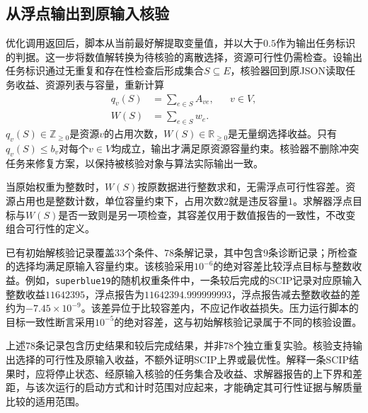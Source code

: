 \subsection{从浮点输出到原输入核验}

优化调用返回后，脚本从当前最好解提取变量值，并以大于$0.5$作为输出任务标识的判据。这一步将数值解转换为待核验的离散选择，资源可行性仍需检查。设输出任务标识通过无重复和存在性检查后形成集合$S\subseteq E$，核验器回到原JSON读取任务收益、资源列表与容量，重新计算
\begin{align}
 q_v(S)&=\sum_{e\in S}A_{ve},
 &&v\in V,
 \label{s0301:verified_load}\\
 W(S)&=\sum_{e\in S}w_e.
 \label{s0301:verified_value}
\end{align}
$q_v(S)\in\mathbb{Z}_{\geq0}$是资源$v$的占用次数，$W(S)\in\mathbb{R}_{\geq0}$是无量纲选择收益。只有$q_v(S)\leq b_v$对每个$v\in V$均成立，输出才满足原资源容量约束。核验器不删除冲突任务来修复方案，以保持被核验对象与算法实际输出一致。

当原始权重为整数时，$W(S)$按原数据进行整数求和，无需浮点可行性容差。资源占用也是整数计数，单位容量约束下，占用次数$2$就是违反容量$1$。求解器浮点目标与$W(S)$是否一致则是另一项检查，其容差仅用于数值报告的一致性，不改变组合可行性的定义。

已有初始解核验记录覆盖$33$个条件、$78$条解记录，其中包含$9$条诊断记录；所检查的选择均满足原输入容量约束。该核验采用$10^{-6}$的绝对容差比较浮点目标与整数收益。例如，\texttt{superblue19}的随机权重条件中，一条较后完成的SCIP记录对应原输入整数收益$11642395$，浮点报告为$11642394.999999993$，浮点报告减去整数收益的差约为$-7.45\times10^{-9}$。该差异位于比较容差内，不应记作收益损失。压力运行脚本的目标一致性断言采用$10^{-5}$的绝对容差，这与初始解核验记录属于不同的核验设置。

上述$78$条记录包含历史结果和较后完成结果，并非$78$个独立重复实验。核验支持输出选择的可行性及原输入收益，不额外证明SCIP上界或最优性。解释一条SCIP结果时，应将停止状态、经原输入核验的任务集合及收益、求解器报告的上下界和差距，与该次运行的启动方式和计时范围对应起来，才能确定其可行性证据与解质量比较的适用范围。